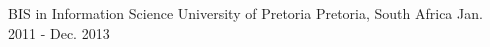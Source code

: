 \begin{cventries}
  \cventry
    {BIS in Information Science} %
    {University of Pretoria} %
    {Pretoria, South Africa} %
    {Jan. 2011 - Dec. 2013} %
    {}
\end{cventries}
